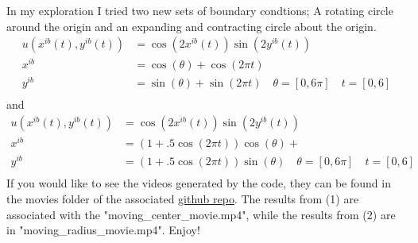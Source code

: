 \documentclass[12pt]{article}
\begin{document}
        In my exploration I tried two new sets of boundary condtions; A rotating circle around the origin and an expanding and contracting circle about the origin.
        \begin{subequations}
            \begin{align}
                u(x^{ib}(t),y^{ib}(t)) &= \cos(2x^{ib}(t))\sin(2y^{ib}(t))\\
                x^{ib} &= \cos(\theta) + \cos(2\pi t)\\
                y^{ib} &= \sin(\theta) + \sin(2\pi t) \quad \theta = [0, 6\pi] \quad t = [0, 6]\\
            \end{align}
        \end{subequations}
        and 
        \begin{subequations}
            \begin{align}
                u(x^{ib}(t),y^{ib}(t)) &= \cos(2x^{ib}(t))\sin(2y^{ib}(t))\\
                x^{ib} &= (1+.5\cos(2\pi t))\cos(\theta) + \\
                y^{ib} &= (1+.5\cos(2\pi t))\sin(\theta) \quad \theta = [0, 6\pi] \quad t = [0, 6]\\
            \end{align}
        \end{subequations}
        If you would like to see the videos generated by the code, they can be found in the movies folder of the associated \href{https://github.com/Hugh-Scribner/Math550_HW2/tree/main/Movies}{github repo}. The results from (1) are associated with the "moving\_center\_movie.mp4", while the results from (2) are in "moving\_radius\_movie.mp4". Enjoy!
\end{document}
